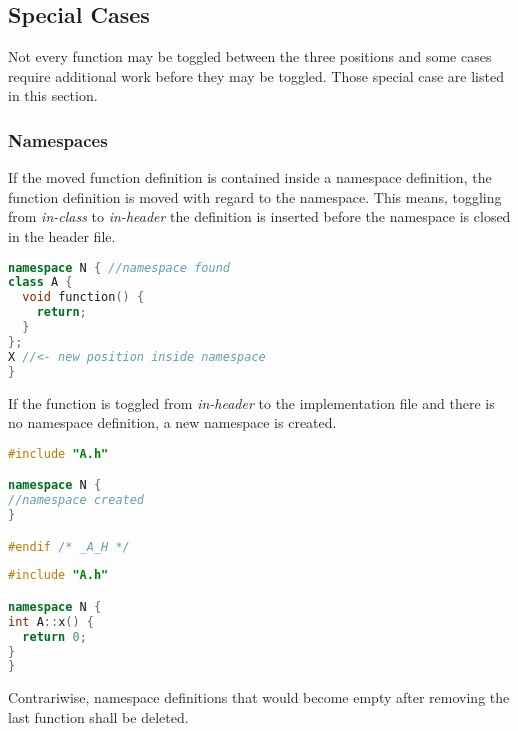 \subsection{Special Cases}

Not every function may be toggled between the three positions and some cases 
require additional work before they may be toggled. Those special case are 
listed in this section.

\subsubsection{Namespaces}

If the moved function definition is contained inside a namespace definition,
the function definition is moved with regard to the namespace. This means,
toggling from \textit{in-class} to \textit{in-header} the definition is
inserted before the namespace is closed in the header file.

\begin{lstlisting}[caption={A.cpp},label={twofilesolution_impl},language=C++]
namespace N { //namespace found
class A {
  void function() {
    return;
  }
};
X //<- new position inside namespace
}
\end{lstlisting}

If the function is toggled from \textit{in-header} to the implementation file
and there is no namespace definition, a new namespace is created.

\vspace{0.5cm}
\begin{minipage}{.48\textwidth}
\lstset{xrightmargin=0.5cm}
\begin{lstlisting}[caption={A.cpp,new namespace created},
label={addnamespace1}, language=C++]
#include "A.h"

namespace N {
//namespace created
}

#endif /* _A_H */
\end{lstlisting}
\end{minipage}%
\begin{minipage}{.48\textwidth}
\lstset{xleftmargin=0.5cm}
\begin{lstlisting}[caption={A.cpp,insterted func.},
label={addnamespace2},language=C++]
#include "A.h"

namespace N {
int A::x() { 
  return 0;
}
}
\end{lstlisting}
\end{minipage}

Contrariwise, namespace definitions that would become empty after removing the 
last function shall be deleted.


